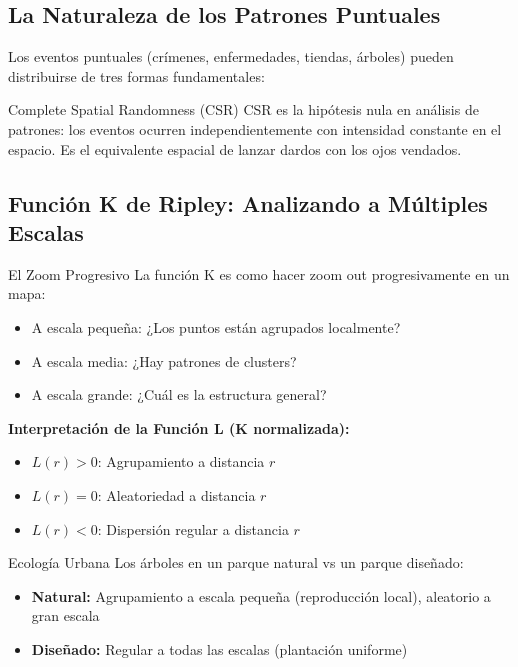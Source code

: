 \documentclass[12pt,a4paper]{article}
\begin{document}
\subsection{La Naturaleza de los Patrones Puntuales}

Los eventos puntuales (crímenes, enfermedades, tiendas, árboles) pueden distribuirse de tres formas fundamentales:

\begin{conceptbox}{Complete Spatial Randomness (CSR)}
CSR es la hipótesis nula en análisis de patrones: los eventos ocurren independientemente con intensidad constante en el espacio. Es el equivalente espacial de lanzar dardos con los ojos vendados.
\end{conceptbox}

\subsection{Función K de Ripley: Analizando a Múltiples Escalas}

\begin{analogia}{El Zoom Progresivo}
La función K es como hacer zoom out progresivamente en un mapa:
\begin{itemize}
    \item A escala pequeña: ¿Los puntos están agrupados localmente?
    \item A escala media: ¿Hay patrones de clusters?
    \item A escala grande: ¿Cuál es la estructura general?
\end{itemize}
\end{analogia}

\textbf{Interpretación de la Función L (K normalizada):}
\begin{itemize}
    \item $L(r) > 0$: Agrupamiento a distancia $r$
    \item $L(r) = 0$: Aleatoriedad a distancia $r$
    \item $L(r) < 0$: Dispersión regular a distancia $r$
\end{itemize}

\begin{ejemplo}{Ecología Urbana}
Los árboles en un parque natural vs un parque diseñado:
\begin{itemize}
    \item \textbf{Natural:} Agrupamiento a escala pequeña (reproducción local), aleatorio a gran escala
    \item \textbf{Diseñado:} Regular a todas las escalas (plantación uniforme)
\end{itemize}
\end{ejemplo}
\end{document}
